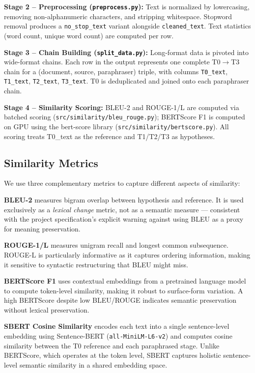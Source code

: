 \documentclass[10pt,twocolumn]{article}
\begin{document}
\textbf{Stage 2 -- Preprocessing (\texttt{preprocess.py}):} Text is
normalized by lowercasing, removing non-alphanumeric characters, and
stripping whitespace. Stopword removal produces a \texttt{no\_stop\_text}
variant alongside \texttt{cleaned\_text}. Text statistics (word count,
unique word count) are computed per row.

\textbf{Stage 3 -- Chain Building (\texttt{split\_data.py}):} Long-format
data is pivoted into wide-format chains. Each row in the output represents
one complete T0$\rightarrow$T3 chain for a (document, source, paraphraser)
triple, with columns \texttt{T0\_text}, \texttt{T1\_text}, \texttt{T2\_text},
\texttt{T3\_text}. T0 is deduplicated and joined onto each paraphraser chain.

\textbf{Stage 4 -- Similarity Scoring:} BLEU-2 and ROUGE-1/L are computed
via batched scoring (\texttt{src/similarity/bleu\_rouge.py}); BERTScore F1
is computed on GPU using the bert-score library
(\texttt{src/similarity/bertscore.py}). All scoring treats T0\_text as
the reference and T1/T2/T3 as hypotheses.

\subsection{Similarity Metrics}
We use three complementary metrics to capture different aspects of similarity:

\textbf{BLEU-2} measures bigram overlap between hypothesis and reference.
It is used exclusively as a \emph{lexical change} metric, not as a semantic
measure --- consistent with the project specification's explicit warning
against using BLEU as a proxy for meaning preservation.

\textbf{ROUGE-1/L} measures unigram recall and longest common subsequence.
ROUGE-L is particularly informative as it captures ordering information,
making it sensitive to syntactic restructuring that BLEU might miss.

\textbf{BERTScore F1} uses contextual embeddings from a pretrained language
model to compute token-level similarity, making it robust to surface-form
variation. A high BERTScore despite low BLEU/ROUGE indicates semantic
preservation without lexical preservation.

\textbf{SBERT Cosine Similarity} encodes each text into a single
sentence-level embedding using Sentence-BERT (\texttt{all-MiniLM-L6-v2})
and computes cosine similarity between the T0 reference and each
paraphrased stage. Unlike BERTScore, which operates at the token level,
SBERT captures holistic sentence-level semantic similarity in a shared
embedding space.
\end{document}
